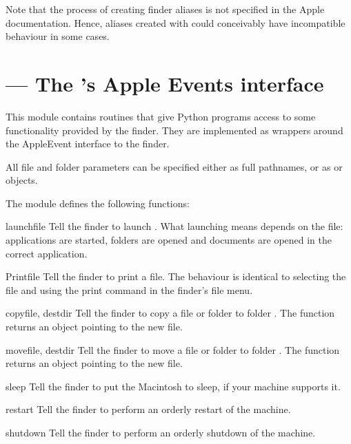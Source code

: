 Note that the process of creating finder aliases is not specified in
the Apple documentation. Hence, aliases created with 
could conceivably have incompatible behaviour in some cases.


\section{ ---
         The 's Apple Events interface}



This module contains routines that give Python programs access to some
functionality provided by the finder. They are implemented as wrappers
around the AppleEvent interface to the finder.

All file and folder parameters can be specified either as full
pathnames, or as  or  objects.

The  module defines the following functions:


\begin{funcdesc}{launch}{file}
Tell the finder to launch . What launching means depends on the file:
applications are started, folders are opened and documents are opened
in the correct application.
\end{funcdesc}

\begin{funcdesc}{Print}{file}
Tell the finder to print a file. The behaviour is identical to selecting the file and using
the print command in the finder's file menu.
\end{funcdesc}

\begin{funcdesc}{copy}{file, destdir}
Tell the finder to copy a file or folder  to folder
. The function returns an  object pointing to
the new file.
\end{funcdesc}

\begin{funcdesc}{move}{file, destdir}
Tell the finder to move a file or folder  to folder
. The function returns an  object pointing to
the new file.
\end{funcdesc}

\begin{funcdesc}{sleep}{}
Tell the finder to put the Macintosh to sleep, if your machine
supports it.
\end{funcdesc}

\begin{funcdesc}{restart}{}
Tell the finder to perform an orderly restart of the machine.
\end{funcdesc}

\begin{funcdesc}{shutdown}{}
Tell the finder to perform an orderly shutdown of the machine.
\end{funcdesc}
